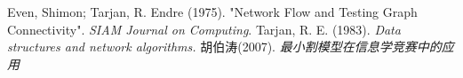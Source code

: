 \begin{thebibliography}{999}
	 Even, Shimon; Tarjan, R. Endre (1975).
	"Network Flow and Testing Graph Connectivity".
    \emph{SIAM Journal on Computing}.
     Tarjan, R. E. (1983).
    \emph{Data structures and network algorithms.}
    胡伯涛(2007). \emph{最小割模型在信息学竞赛中的应用}
\end{thebibliography}

